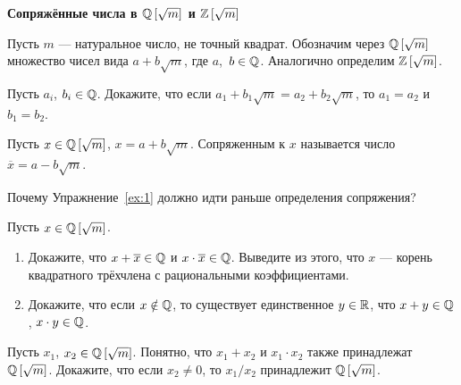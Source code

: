 \documentclass{article}
\begin{document}
    \large

    \begin{center}
        \textbf{Сопряжённые числа в $\mathbb{Q}\left[\sqrt{m}\right]$ и $\mathbb{Z}\left[\sqrt{m}\right]$}
    \end{center}

    \begin{definition}
        Пусть $m$ --- натуральное число, не точный квадрат.
        Обозначим через $\mathbb{Q}\left[\sqrt{m}\right]$ множество чисел вида
        $a+b\sqrt{m}$, где $a$,~$b\in \mathbb{Q}$.
        Аналогично определим $\mathbb{Z}\left[\sqrt{m}\right]$.
    \end{definition}

    \begin{exercise}
        \label{ex:1}
        Пусть $a_i$, $b_i\in \mathbb{Q}$.
        Докажите, что если $a_1+b_1\sqrt{m}=a_2+b_2\sqrt{m}$, то $a_1=a_2$ и $b_1=b_2$.
    \end{exercise}

    \begin{definition}
        Пусть $x\in \mathbb{Q}\left[\sqrt{m}\right]$, $x=a+b\sqrt{m}$.
        Сопряженным к $x$ называется число $\overline{x}=a-b\sqrt{m}$.
    \end{definition}

    \begin{exercise}
        Почему Упражнение~\ref{ex:1} должно идти раньше определения сопряжения?
    \end{exercise}

    \begin{exercise}
        Пусть $x\in \mathbb{Q}\left[\sqrt{m}\right]$.
        \begin{enumerate}[label*=\alph*)]
            \item Докажите, что $x+\overline{x}\in \mathbb{Q}$ и $x\cdot \overline{x}\in\mathbb{Q}$.
            Выведите из этого, что $x$ --- корень квадратного трёхчлена с рациональными коэффициентами.
            \item Докажите, что если $x\notin \mathbb{Q}$, то существует единственное $y\in \mathbb{R}$, что $x+y\in \mathbb{Q}$, $x\cdot y\in \mathbb{Q}$.
        \end{enumerate}
    \end{exercise}

    \begin{exercise}
        Пусть $x_1$, $x_2\in \mathbb{Q}\left[\sqrt{m}\right]$.
        Понятно, что $x_1+x_2$ и ${x_1\cdot x_2}$ также принадлежат
        $\mathbb{Q}\left[\sqrt{m}\right]$.
        Докажите, что если $x_2\neq 0$, то $x_1/x_2$ принадлежит $\mathbb{Q}\left[\sqrt{m}\right]$.
    \end{exercise}
\end{document}
